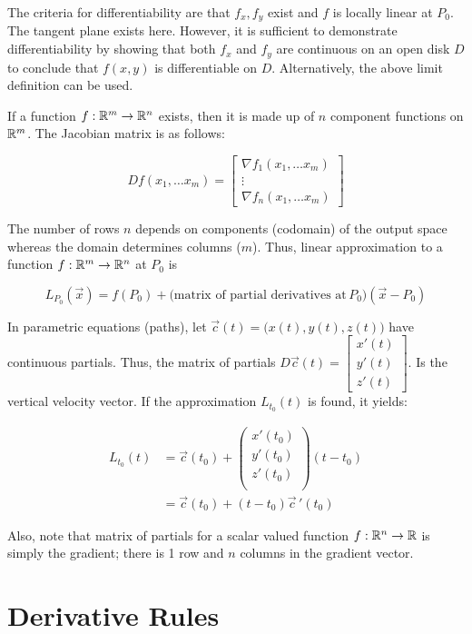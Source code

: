 The criteria for differentiability are that $f_x,f_y$ exist and $f$ is locally linear at $P_0$. The tangent plane exists here. However,
it is sufficient to demonstrate differentiability by showing that both $f_x$ and $f_y$ are continuous on an open disk $D$ to conclude that $f(x,y)$
is differentiable on $D$. Alternatively, the above limit definition can be used.

If a function $f:\mathbb{R}^m\to \mathbb{R}^n$ exists, then it is made up of $n$ component functions on $\mathbb{R}^m$. The Jacobian matrix is as follows:

\[Df\left( x_1,\ldots x_m\right) =\begin{bmatrix} \nabla f_{1}\left(x_1,\ldots x_m\right) \\ \vdots \\ \nabla f_{n}\left(x_1,\ldots x_m\right) \end{bmatrix}\]

The number of rows $n$ depends on components (codomain) of the output space whereas the domain determines columns ($m$). Thus, linear approximation to a function $f:\mathbb{R}^m\to \mathbb{R}^n$ at $P_0$ is

\[L_{P_0}(\vec{x})=f(P_0)+\Big(\mbox{matrix of partial derivatives at}\,P_0\Big)(\vec{x}-P_0)\]

In parametric equations (paths), let $\vec{c}(t)=\big(x(t), y(t), z(t) \big)$ have continuous partials.
Thus, the matrix of partials $D\vec c(t)=\begin{bmatrix}x'(t)\\y'(t)\\z'(t)\end{bmatrix}$. Is the vertical velocity vector.
If the approximation $L_{t_0}(t)$ is found, it yields:

\begin{align*}
    L_{t_0}(t)&=\vec c(t_0)+
    \left(
    \begin{matrix}
    x'(t_0)\\
    y'(t_0)\\
    z'(t_0)\\
    \end{matrix}
    \right)
    (t-t_0)\\
    &=\vec{c} (t_0)+(t-t_0)\vec c\,'(t_0)
\end{align*}

Also, note that matrix of partials for a scalar valued function $f:\mathbb{R}^n\to \mathbb{R}$ is simply the gradient; there is 1 row and $n$ columns in the gradient vector.

\section{Derivative Rules}

